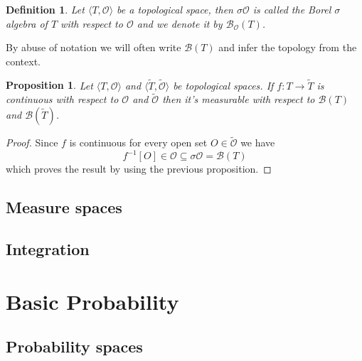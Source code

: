 \documentclass[a4paper]{amsart}
\newtheorem{deff}{Definition}
\newtheorem{prop}{Proposition}
\newcommand{\borr}[2]{\mathscr{B}_{#1}\left(#2\right)}
\newcommand{\bor}[1]{\mathscr{B}\left(#1\right)}
\newcommand{\pair}[2]{\langle #1, #2\rangle}
\begin{document}
\begin{deff}
    Let $\pair{T}{\mathcal{O}}$ be a topological space, then 
    $\sigma\mathcal{O}$ is called the Borel $\sigma$ algebra 
    of $T$ with respect to $\mathcal{O}$ and we denote it by 
    $\borr{\mathcal{O}}{T}$.
\end{deff}

By abuse of notation we will often write $\bor{T}$ and infer 
the topology from the context.

\begin{prop}
    Let $\pair{T}{\mathcal{O}}$ and $\pair{\tilde{T}}{\tilde{\mathcal{O}}}$ be topological spaces. 
    If $f : T \longrightarrow \tilde{T}$ is continuous with 
    respect to $\mathcal{O}$ and $\tilde{\mathcal{O}}$ then 
    it's measurable with respect to $\bor{T}$ and $
    \bor{\tilde{T}}$.
\end{prop}

\begin{proof}
    Since $f$ is continuous for every open set $O \in 
    \tilde{\mathcal{O}}$  we have
    $$
    f^{-1}[O] \in \mathcal{O} \subseteq \sigma\mathcal{O} 
    = \bor{T}
    $$
    which proves the result by using the previous proposition.
\end{proof}



\subsection{Measure spaces}

\subsection{Integration}

\section{Basic Probability}

\subsection{Probability spaces}
\end{document}
